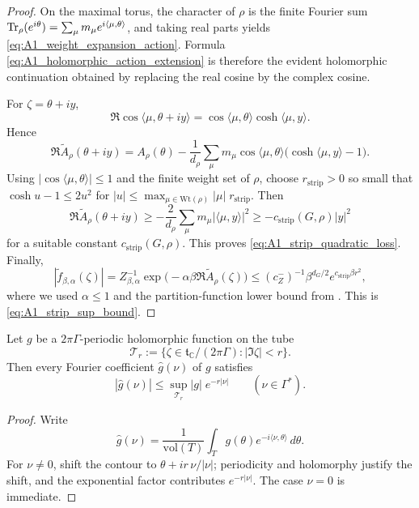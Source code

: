 \begin{proof}
On the maximal torus, the character of $\rho$ is the finite Fourier sum
$\mathrm{Tr}_\rho(e^{i\theta})=\sum_\mu m_\mu e^{i\langle\mu,\theta\rangle}$, and taking real parts yields \eqref{eq:A1_weight_expansion_action}.
Formula \eqref{eq:A1_holomorphic_action_extension} is therefore the evident holomorphic continuation obtained by replacing the real cosine by the complex cosine.

For $\zeta=\theta+iy$,
\[
\Re\cos\langle\mu,\theta+iy\rangle
=
\cos\langle\mu,\theta\rangle\cosh\langle\mu,y\rangle.
\]
Hence
\[
\Re\widetilde A_\rho(\theta+iy)
=
A_\rho(\theta)
-
\frac{1}{d_\rho}
\sum_\mu m_\mu \cos\langle\mu,\theta\rangle\bigl(\cosh\langle\mu,y\rangle-1\bigr).
\]
Using $|\cos\langle\mu,\theta\rangle|\le 1$ and the finite weight set of $\rho$, choose $r_{\mathrm{strip}}>0$ so small that
$\cosh u-1\le 2u^2$ for $|u|\le \max_{\mu\in\mathrm{Wt}(\rho)}|\mu|\;r_{\mathrm{strip}}$.
Then
\[
\Re\widetilde A_\rho(\theta+iy)
\ge
-
\frac{2}{d_\rho}
\sum_\mu m_\mu |\langle\mu,y\rangle|^2
\ge
-c_{\mathrm{strip}}(G,\rho)|y|^2
\]
for a suitable constant $c_{\mathrm{strip}}(G,\rho)$.
This proves \eqref{eq:A1_strip_quadratic_loss}.
Finally,
\[
|\widetilde f_{\beta,\alpha}(\zeta)|
=
Z_{\beta,\alpha}^{-1}
\exp\!\bigl(-\alpha\beta\Re\widetilde A_\rho(\zeta)\bigr)
\le
(c_Z^-)^{-1}\beta^{d_G/2}e^{c_{\mathrm{strip}}\beta r^2},
\]
where we used $\alpha\le 1$ and the partition-function lower bound from .
This is \eqref{eq:A1_strip_sup_bound}.
\end{proof}

\begin{lemma}\label{lem:A1_torus_strip_fourier}
Let $g$ be a $2\pi\Gamma$-periodic holomorphic function on the tube
\[
\mathcal T_r:=\{\zeta\in\mathfrak t_\mathbb C/(2\pi\Gamma): |\Im\zeta|<r\}.
\]
Then every Fourier coefficient $\widehat g(\nu)$ of $g$ satisfies
\begin{equation}\label{eq:A1_torus_strip_fourier_bound}
|\widehat g(\nu)|
\le
\sup_{\mathcal T_r}|g|\;e^{-r|\nu|}
\qquad (\nu\in \Gamma^\ast).
\end{equation}
\end{lemma}

\begin{proof}
Write
\[
\widehat g(\nu)=\frac{1}{\mathrm{vol}(T)}\int_T g(\theta)e^{-i\langle\nu,\theta\rangle}\,d\theta.
\]
For $\nu\neq 0$, shift the contour to $\theta+i r\,\nu/|\nu|$; periodicity and holomorphy justify the shift, and the exponential factor contributes $e^{-r|\nu|}$.
The case $\nu=0$ is immediate.
\end{proof}


